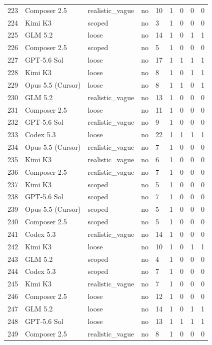 \begin{tabular}{lllllllll}
223 & Composer 2.5 & realistic\_vague & no & 10 & 1 & 0 & 0 & 0 \\
224 & Kimi K3 & scoped & no & 3 & 1 & 0 & 0 & 0 \\
225 & GLM 5.2 & loose & no & 14 & 1 & 0 & 1 & 1 \\
226 & Composer 2.5 & scoped & no & 5 & 1 & 0 & 0 & 0 \\
227 & GPT-5.6 Sol & loose & no & 17 & 1 & 1 & 1 & 1 \\
228 & Kimi K3 & loose & no & 8 & 1 & 0 & 1 & 1 \\
229 & Opus 5.5 (Cursor) & loose & no & 8 & 1 & 1 & 0 & 1 \\
230 & GLM 5.2 & realistic\_vague & no & 13 & 1 & 0 & 0 & 0 \\
231 & Composer 2.5 & loose & no & 11 & 1 & 0 & 0 & 0 \\
232 & GPT-5.6 Sol & realistic\_vague & no & 9 & 1 & 0 & 0 & 0 \\
233 & Codex 5.3 & loose & no & 22 & 1 & 1 & 1 & 1 \\
234 & Opus 5.5 (Cursor) & realistic\_vague & no & 7 & 1 & 0 & 0 & 0 \\
235 & Kimi K3 & realistic\_vague & no & 6 & 1 & 0 & 0 & 0 \\
236 & Composer 2.5 & realistic\_vague & no & 7 & 1 & 0 & 0 & 0 \\
237 & Kimi K3 & scoped & no & 5 & 1 & 0 & 0 & 0 \\
238 & GPT-5.6 Sol & scoped & no & 7 & 1 & 0 & 0 & 0 \\
239 & Opus 5.5 (Cursor) & scoped & no & 5 & 1 & 0 & 0 & 0 \\
240 & Composer 2.5 & scoped & no & 5 & 1 & 0 & 0 & 0 \\
241 & Codex 5.3 & realistic\_vague & no & 14 & 1 & 0 & 0 & 0 \\
242 & Kimi K3 & loose & no & 10 & 1 & 0 & 1 & 1 \\
243 & GLM 5.2 & scoped & no & 4 & 1 & 0 & 0 & 0 \\
244 & Codex 5.3 & scoped & no & 7 & 1 & 0 & 0 & 0 \\
245 & Kimi K3 & realistic\_vague & no & 7 & 1 & 0 & 0 & 0 \\
246 & Composer 2.5 & loose & no & 12 & 1 & 0 & 0 & 0 \\
247 & GLM 5.2 & loose & no & 14 & 1 & 0 & 1 & 1 \\
248 & GPT-5.6 Sol & loose & no & 13 & 1 & 1 & 1 & 1 \\
249 & Composer 2.5 & realistic\_vague & no & 8 & 1 & 0 & 0 & 0 \\

\end{tabular}
